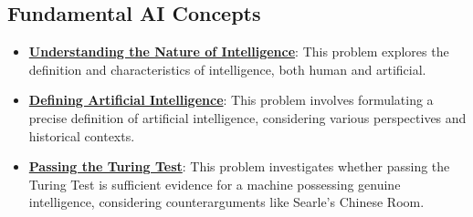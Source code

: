\documentclass{article}%
\begin{document}
\subsection{Fundamental AI Concepts}%
\label{subsec:FundamentalAIConcepts}%
\begin{itemize}[leftmargin=*]%
\item \href{\url{https://purdue.brightspace.com/d2l/common/assets/pdfjs-d2l-dist/1.0.14-legacy/web/viewer.html?file=\%252Fcontent\%252Fenforced\%252F1095467-wl.202510.CS.24300.001\%252F02L2-Intro.pdf\%253Fou\%253D1095467\&lang=en-us\&container=d2l-fileviewer-rendered-pdf\&fullscreen=d2l-fileviewer-rendered-pdf-dialog\&height=667}#page=3}{\textbf{Understanding the Nature of Intelligence}}: This problem explores the definition and characteristics of intelligence, both human and artificial.%
\item \href{\url{https://purdue.brightspace.com/d2l/common/assets/pdfjs-d2l-dist/1.0.14-legacy/web/viewer.html?file=\%252Fcontent\%252Fenforced\%252F1095467-wl.202510.CS.24300.001\%252F02L2-Intro.pdf\%253Fou\%253D1095467\&lang=en-us\&container=d2l-fileviewer-rendered-pdf\&fullscreen=d2l-fileviewer-rendered-pdf-dialog\&height=667}#page=5}{\textbf{Defining Artificial Intelligence}}: This problem involves formulating a precise definition of artificial intelligence, considering various perspectives and historical contexts.%
\item \href{\url{https://purdue.brightspace.com/d2l/common/assets/pdfjs-d2l-dist/1.0.14-legacy/web/viewer.html?file=\%252Fcontent\%252Fenforced\%252F1095467-wl.202510.CS.24300.001\%252F02L2-Intro.pdf\%253Fou\%253D1095467\&lang=en-us\&container=d2l-fileviewer-rendered-pdf\&fullscreen=d2l-fileviewer-rendered-pdf-dialog\&height=667}#page=6}{\textbf{Passing the Turing Test}}: This problem investigates whether passing the Turing Test is sufficient evidence for a machine possessing genuine intelligence, considering counterarguments like Searle's Chinese Room.%
\end{itemize}

%
\end{document}

